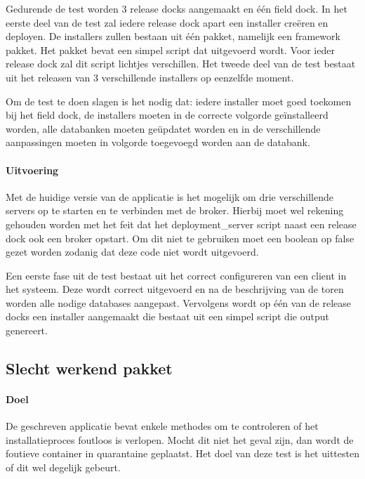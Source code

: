 Gedurende de test worden 3 release docks aangemaakt en één field dock.
In het eerste deel van de test zal iedere release dock apart een installer creëren en deployen.
De installers zullen bestaan uit één pakket, namelijk een framework pakket.
Het pakket bevat een simpel script dat uitgevoerd wordt.
Voor ieder release dock zal dit script lichtjes verschillen.
Het tweede deel van de test bestaat uit het releasen van 3 verschillende installers op eenzelfde moment.

Om de test te doen slagen is het nodig dat: iedere installer moet goed toekomen bij het field dock, de installers moeten in de correcte volgorde geïnstalleerd worden, alle databanken moeten geüpdatet worden en in de verschillende aanpassingen moeten in volgorde toegevoegd worden aan de databank.

\paragraph{Uitvoering}
Met de huidige versie van de applicatie is het mogelijk om drie verschillende servers op te starten en te verbinden met de broker.
Hierbij moet wel rekening gehouden worden met het feit dat het deployment\_server script naast een release dock ook een broker opstart.
Om dit niet te gebruiken moet een boolean op false gezet worden zodanig dat deze code niet wordt uitgevoerd.

Een eerste fase uit de test bestaat uit het correct configureren van een client in het systeem.
Deze wordt correct uitgevoerd en na de beschrijving van de toren worden alle nodige databases aangepast.
Vervolgens wordt op één van de release docks een installer aangemaakt die bestaat uit een simpel script die output genereert.



\subsection{Slecht werkend pakket}
\paragraph{Doel}
De geschreven applicatie bevat enkele methodes om te controleren of het installatieproces foutloos is verlopen.
Mocht dit niet het geval zijn, dan wordt de foutieve container in quarantaine geplaatst.
Het doel van deze test is het uittesten of dit wel degelijk gebeurt.

